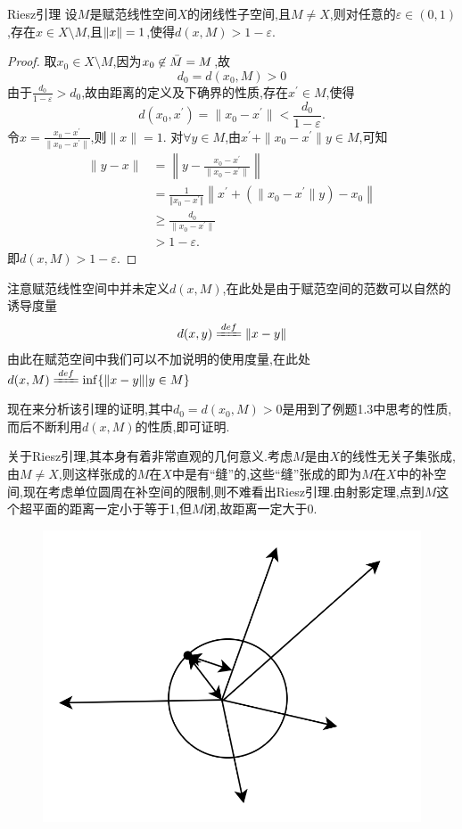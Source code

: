 \documentclass[lang=cn,18pt]{elegantbook}
\begin{document}
\begin{lemma}{Riesz引理}
    设$M$是赋范线性空间$X$的闭线性子空间,且$M\not= X$,则对任意的$\varepsilon \in (0,1)$,存在$x \in X \setminus M$,且$\Arrowvert x \Arrowvert=1$,使得$d(x,M) > 1-\varepsilon$.
\end{lemma}
\begin{proof}
    取$x_0 \in X \setminus M$,因为$x_0 \not\in \Bar{M}=M $,故
$$d_0 =d(x_0,M) > 0$$
由于$\frac{d_0}{1-\varepsilon}>d_0$,故由距离的定义及下确界的性质,存在$x^{\prime}\in M$,使得
$$d(x_0,x^{\prime})=\|x_0-x^{\prime} \| < \frac{d_0}{1-\varepsilon}.$$
令$x=\frac{x_0 - x^{\prime}}{\|x_0 - x^{\prime}\|}$,则$\|x\|=1$.
对$\forall{y \in M}$,由$x^{\prime}+\|x_0 -x^{\prime}\|y \in M$,可知
\begin{align*}
    \|y-x\| &=\left\|y-\frac{x_0 -x^{\prime}}{\|x_0 -x^{\prime}\|}\right\| \\
            &=\frac{1}{\Vert x_0 -x^{\prime}\Vert} \left\| x^{\prime}+(\|x_0 -x^{\prime}\|y)-x_0\right\| \\
            & \geqslant\frac{d_0}{\|x_0 - x^{\prime}\|} \\
            &  > 1-\varepsilon.
\end{align*}
即$d(x,M) > 1-\varepsilon$.
\end{proof}
\begin{note}
    注意赋范线性空间中并未定义$d(x,M)$,在此处是由于赋范空间的范数可以自然的诱导度量
    $$d(x,y)\xlongequal[]{def} \|x-y\|$$
    由此在赋范空间中我们可以不加说明的使用度量,在此处$d(x,M)\xlongequal[]{def}\inf\{\|x-y\||y \in M\}$
    
    现在来分析该引理的证明,其中$d_0 =d(x_0,M) > 0$是用到了例题1.3中思考的性质,而后不断利用$d(x,M)$的性质,即可证明.

    关于Riesz引理,其本身有着非常直观的几何意义.考虑$M$是由$X$的线性无关子集张成,由$M \not= X$,则这样张成的$M$在$X$中是有“缝”的,这些“缝”张成的即为$M$在$X$中的补空间,现在考虑单位圆周在补空间的限制,则不难看出Riesz引理.由射影定理,点到$M$这个超平面的距离一定小于等于1,但$M$闭,故距离一定大于0.
    \begin{figure}[htbp]
    \centering
    \includegraphics[scale=0.5]{figure/6.png}
    \end{figure} 
    \end{note}
\end{document}
